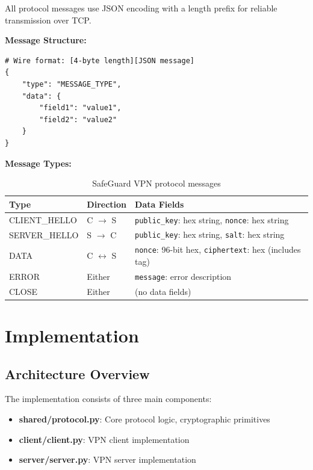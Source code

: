 \documentclass[12pt,a4paper]{article}
\begin{document}
All protocol messages use JSON encoding with a length prefix for reliable transmission over TCP.

\textbf{Message Structure:}
\begin{lstlisting}[style=pythonstyle, caption={Protocol message format}]
# Wire format: [4-byte length][JSON message]
{
    "type": "MESSAGE_TYPE",
    "data": {
        "field1": "value1",
        "field2": "value2"
    }
}
\end{lstlisting}

\textbf{Message Types:}

\begin{table}[H]
\centering
\small
\begin{tabular}{@{}llp{7cm}@{}}
\toprule
\textbf{Type} & \textbf{Direction} & \textbf{Data Fields} \\ \midrule
CLIENT\_HELLO & C $\rightarrow$ S & \texttt{public\_key}: hex string, \texttt{nonce}: hex string \\
SERVER\_HELLO & S $\rightarrow$ C & \texttt{public\_key}: hex string, \texttt{salt}: hex string \\
DATA & C $\leftrightarrow$ S & \texttt{nonce}: 96-bit hex, \texttt{ciphertext}: hex (includes tag) \\
ERROR & Either & \texttt{message}: error description \\
CLOSE & Either & (no data fields) \\
\bottomrule
\end{tabular}
\caption{SafeGuard VPN protocol messages}
\end{table}

\section{Implementation}

\subsection{Architecture Overview}

The implementation consists of three main components:

\begin{itemize}
    \item \textbf{shared/protocol.py}: Core protocol logic, cryptographic primitives
    \item \textbf{client/client.py}: VPN client implementation
    \item \textbf{server/server.py}: VPN server implementation
\end{itemize}
\end{document}

